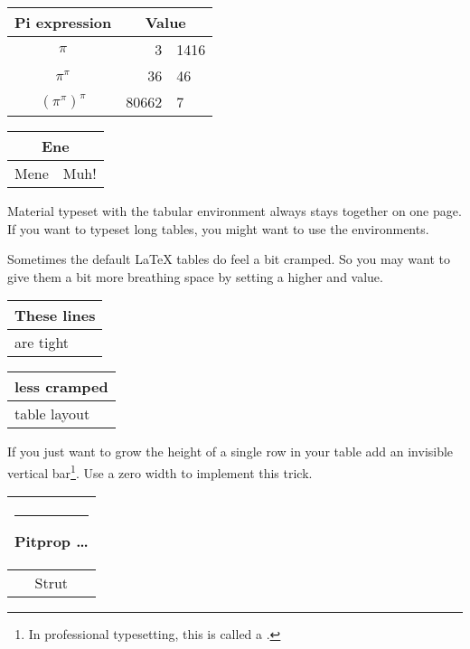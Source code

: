 \begin{example}
\begin{tabular}{c r @{.} l}
Pi expression       &
\multicolumn{2}{c}{Value} \\
\hline
$\pi$               & 3&1416  \\
$\pi^{\pi}$         & 36&46   \\
$(\pi^{\pi})^{\pi}$ & 80662&7 \\
\end{tabular}
\end{example}

\begin{example}
\begin{tabular}{|c|c|}
\hline
\multicolumn{2}{|c|}{Ene} \\
\hline
Mene & Muh! \\
\hline
\end{tabular}
\end{example}

Material typeset with the tabular environment always stays together on one
page. If you want to typeset long tables, you might want to use the
 environments.

Sometimes the default \LaTeX{} tables do feel a bit cramped. So you may want
to give them a bit more breathing space by setting a higher
 and  value.

\begin{example}
\begin{tabular}{|l|}
\hline
These lines\\\hline
are tight\\\hline
\end{tabular}

{\renewcommand{\arraystretch}{1.5}
\renewcommand{\tabcolsep}{0.2cm}
\begin{tabular}{|l|}
\hline
less cramped\\\hline
table layout\\\hline
\end{tabular}}

\end{example}

If you just want to grow the height of a single row in your table add an invisible vertical bar\footnote{In professional typesetting,
this is called a .}. Use a zero width  to implement this trick.

\begin{example}
\begin{tabular}{|c|}
\hline
\rule{1pt}{4ex}Pitprop \ldots\\
\hline
\rule{0pt}{4ex}Strut\\
\hline
\end{tabular}
\end{example}

